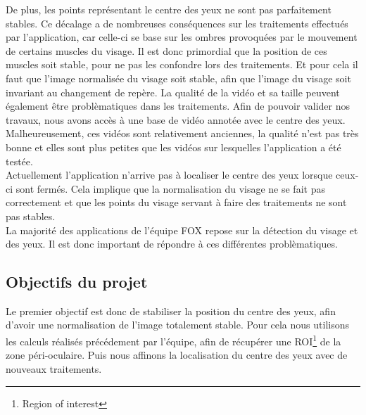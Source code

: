 De plus, les points représentant le centre des yeux ne sont pas parfaitement stables. Ce décalage a de 
nombreuses conséquences sur les traitements effectués par l'application, car celle-ci se base sur 
les ombres provoquées par le mouvement de certains muscles du 
visage. Il est donc primordial que la position de ces muscles soit stable, pour ne pas les confondre
lors des traitements. Et pour cela il faut que l'image normalisée du visage soit stable, afin que l'image
du visage soit invariant au changement de repère.
La qualité de la vidéo et sa taille peuvent également être problèmatiques dans les traitements. Afin de
pouvoir valider nos travaux, nous avons accès à une base de vidéo annotée avec le centre des yeux. 
Malheureusement, ces vidéos sont relativement anciennes, la qualité n'est pas 
très bonne et elles sont plus petites que les vidéos sur lesquelles l'application a été testée.\\

Actuellement l'application n'arrive pas à localiser le centre des yeux lorsque ceux-ci sont fermés. 
Cela implique que la normalisation du visage ne se fait pas correctement et que les points du
visage servant à faire des traitements ne sont pas stables.\\

La majorité des applications de l'équipe FOX repose sur la détection du visage et des yeux. Il est donc 
important de répondre à ces différentes problèmatiques.\\

\subsection{Objectifs du projet}

Le premier objectif est donc de stabiliser la position du centre des yeux, afin d'avoir une normalisation de l'image
totalement stable. Pour cela nous utilisons les calculs réalisés précédement par l'équipe, 
afin de récupérer une ROI\footnote{Region of interest} de la zone péri-oculaire. Puis
nous affinons la localisation du centre des yeux avec de nouveaux traitements.\\

